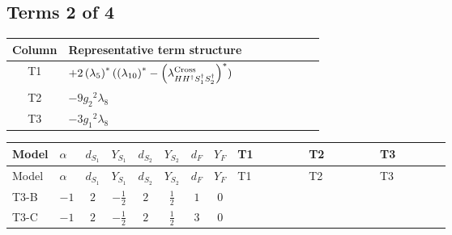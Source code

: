 \documentclass[8pt]{article}
\begin{document}
\begin{landscape}
\subsection*{Terms 2 of 4}
\begin{center}
\begin{tabular}{@{}c >{\raggedright\arraybackslash}p{0.82\linewidth}@{}}
\toprule
Column & Representative term structure \\
\midrule
T1 & \(\displaystyle +2 \left({\lambda_5}\right)^{*} (\left({\lambda_{10}}\right)^{*}-\left({\lambda_{H H^\dagger S_1^\dagger S_2^\dagger}^{\rm Cross}}\right)^{*})\) \\
\midrule
T2 & \(\displaystyle -9 {g_2}^2 {\lambda_{8}}\) \\
\midrule
T3 & \(\displaystyle -3 {g_1}^2 {\lambda_{8}}\) \\
\midrule
\bottomrule
\end{tabular}
\end{center}
\smallskip
\tiny
\begin{longtable}{@{}llcccccc >{\raggedright\arraybackslash}p{0.21\linewidth} >{\raggedright\arraybackslash}p{0.21\linewidth} >{\raggedright\arraybackslash}p{0.21\linewidth}@{}}
\toprule
Model & $\alpha$ & $d_{S_1}$ & $Y_{S_1}$ & $d_{S_2}$ & $Y_{S_2}$ & $d_F$ & $Y_F$ & T1 & T2 & T3 \\
\midrule
\endfirsthead
\toprule
Model & $\alpha$ & $d_{S_1}$ & $Y_{S_1}$ & $d_{S_2}$ & $Y_{S_2}$ & $d_F$ & $Y_F$ & T1 & T2 & T3 \\
\midrule
\endhead
T3-B & $-1$ & $2$ & $-\frac{1}{2}$ & $2$ & $\frac{1}{2}$ & $1$ & $0$ & \scriptsize\adjustbox{max width=\linewidth}{$\begin{gathered} +2 \left({\lambda_5}\right)^{*} (\left({\lambda_{10}}\right)^{*}-\left({\lambda_{H H^\dagger S_1^\dagger S_2^\dagger}^{\rm Cross}}\right)^{*})\end{gathered}$} & \scriptsize\adjustbox{max width=\linewidth}{$\begin{gathered} -9 {g_2}^2 {\lambda_{8}}\end{gathered}$} & \scriptsize\adjustbox{max width=\linewidth}{$\begin{gathered} -3 {g_1}^2 {\lambda_{8}}\end{gathered}$} \\
\midrule
T3-C & $-1$ & $2$ & $-\frac{1}{2}$ & $2$ & $\frac{1}{2}$ & $3$ & $0$ & \scriptsize\adjustbox{max width=\linewidth}{$\begin{gathered} +2 \left({\lambda_5}\right)^{*} (\left({\lambda_{10}}\right)^{*}-\left({\lambda_{H H^\dagger S_1^\dagger S_2^\dagger}^{\rm Cross}}\right)^{*})\end{gathered}$} & \scriptsize\adjustbox{max width=\linewidth}{$\begin{gathered} -9 {g_2}^2 {\lambda_{8}}\end{gathered}$} & \scriptsize\adjustbox{max width=\linewidth}{$\begin{gathered} -3 {g_1}^2 {\lambda_{8}}\end{gathered}$} \\

\end{longtable}
\end{landscape}
\end{document}

